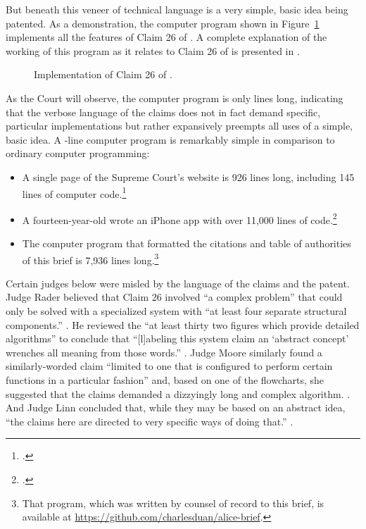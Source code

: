 \documentclass{scotus}
\begin{document}
But beneath this veneer
of technical language is a very simple, basic idea being patented. As a
demonstration, the computer program shown in Figure~\ref{code-listing}
implements all the features of Claim 26 of .
A complete explanation of the working of
this program as it relates to Claim 26 of  is presented in
.

\def\floatpagefraction{.1}
\begin{figure}[p]
\inlinebox{\wholeprogram}%
\baselineskip
\caption{Implementation of Claim 26 of \protect{}.}
\label{code-listing}
\end{figure}

As the Court will observe, the computer program is only \numlines lines long,
indicating that
the verbose language of the claims does not in fact demand specific, particular
implementations but rather expansively preempts all uses of a simple, basic
idea. A \numlines-line computer program is remarkably simple in comparison to
ordinary computer programming:
\begin{itemize}
\item A single page of the Supreme Court's website is 926 lines long, including
145 lines of computer code.\footnote{.}
\item A fourteen-year-old wrote an iPhone app with over 11,000 lines of
code.\footnote{.}
\item The computer program that formatted the citations
and table of authorities of this brief is 7,936 lines long.\footnote{That
program, which was written by counsel of record to this brief, is available at
\url{https://github.com/charlesduan/alice-brief}.}
\end{itemize}

Certain
judges below were misled by the language of the
claims and the patent.
Judge Rader believed that Claim 26 involved
``a complex problem'' that could only be solved with a specialized system
with ``at least four separate structural components.'' . He reviewed the ``at least thirty two figures
which
provide detailed algorithms'' to conclude that ``[l]abeling
this system claim an `abstract concept' wrenches all meaning from those words.''
. Judge Moore similarly found a
similarly-worded claim ``limited to one that is configured to perform certain
functions in a particular fashion'' and, based on one of the
flowcharts, she suggested that the claims demanded a dizzyingly long
and complex algorithm. . And Judge Linn
concluded that, while they may be based
on an abstract idea, ``the claims here are directed to very specific ways of
doing that.''
.
\end{document}
